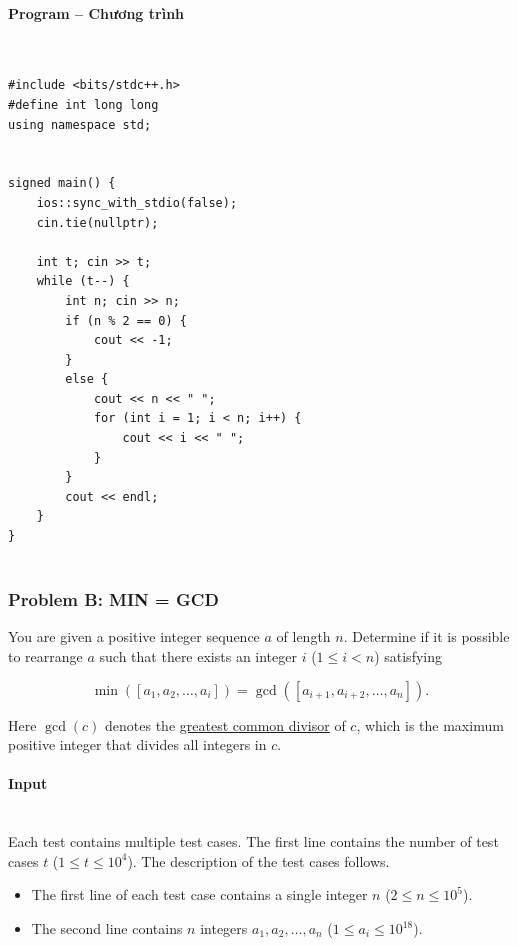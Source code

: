 \documentclass{article}
\begin{document}
\paragraph{Program -- Chương trình} \mbox{} \\

\begin{lstlisting}
#include <bits/stdc++.h>
#define int long long
using namespace std;


signed main() {
	ios::sync_with_stdio(false);
	cin.tie(nullptr);

	int t; cin >> t;
	while (t--) {
		int n; cin >> n;
		if (n % 2 == 0) {
			cout << -1;
		}
		else {
			cout << n << " ";
			for (int i = 1; i < n; i++) {
				cout << i << " ";
			}
		}
		cout << endl;
	}
}
	
\end{lstlisting}

\subsubsection{Problem B: MIN = GCD}

You are given a positive integer sequence $a$ of length $n$. Determine if it is possible to rearrange $a$ such that there exists an integer $i$ ($1 \le i < n$) satisfying

\[
\min([a_1, a_2, \ldots, a_i]) = \gcd([a_{i+1}, a_{i+2}, \ldots, a_n]).
\]

Here $\gcd(c)$ denotes the \href{https://en.wikipedia.org/wiki/Greatest_common_divisor}{greatest common divisor} of $c$, which is the maximum positive integer that divides all integers in $c$.


\paragraph{Input} \mbox{} \\

Each test contains multiple test cases. The first line contains the number of test cases $t$ ($1 \le t \le 10^4$). The description of the test cases follows.

\begin{itemize}
    \item The first line of each test case contains a single integer $n$ ($2 \le n \le 10^5$).
    \item The second line contains $n$ integers $a_1, a_2, \ldots, a_n$ ($1 \le a_i \le 10^{18}$).
\end{itemize}
\end{document}
